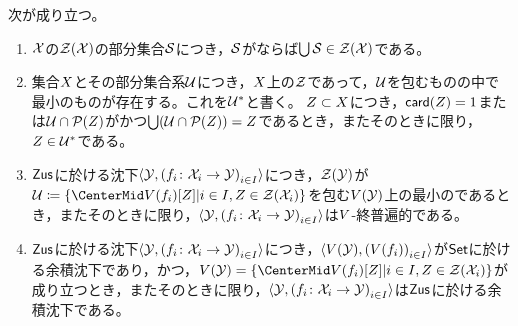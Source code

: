 \begin{theorem}
    次が成り立つ。
    \begin{enumerate}
        \item \WordConnectivitySpace\(\ConnectivitySpace\)の\WordConnectivityStructure\(\ConnectivityStructure(\ConnectivitySpace)\)の部分集合\(\Set<\mathcal{S}>\)につき，\(\Set<\mathcal{S}>\)が\WordChainLinked ならば\(\bigcup\Set<\mathcal{S}>\in\ConnectivityStructure(\ConnectivitySpace)\)である。
        \item 集合\(\Set\)とその部分集合系\(\Set<\mathcal{U}>\)につき，\(\Set\)上の\WordConnectivityStructure\(\ConnectivityStructure\)であって，\(\Set<\mathcal{U}>\)を包むものの中で最小のものが存在する。これを\(\ConnectivityStructureGeneratedBy(\Set<\mathcal{U}>)\)と書く。
        \(\Set<Z>\subset\Set\)につき，\(\Cardinality(\Set<Z>)=1\)または\(\Set<\mathcal{U}>\cap\PowerSet(\Set<Z>)\)が\WordChainLinked かつ\(\bigcup(\Set<\mathcal{U}>\cap\PowerSet(\Set<Z>))=\Set<Z>\)であるとき，またそのときに限り，\(\Set<Z>\in\ConnectivityStructureGeneratedBy(\Set<\mathcal{U}>)\)である。
        \item \(\mathsf{Zus}\)に於ける沈下\(\OrderedSet<\ConnectivitySpace<Y>, \FamilyStyle{\FunctionStyle{\Map_{\Index}}{\ConnectivitySpace_{\Index}}{\ConnectivitySpace<Y>}}{\Index\in\IndexSet}>\)につき，\(\ConnectivityStructure(\ConnectivitySpace<Y>)\)が\(\Set<\mathcal{U}>\coloneqq\Set{\VFunctor(\Map_{\Index})[\Set<Z>] | \Index\in\IndexSet, \Set<Z>\in\ConnectivityStructure(\ConnectivitySpace_{\Index})}\)を包む\(\VFunctor(\ConnectivitySpace<Y>)\)上の最小の\WordConnectivityStructure であるとき，またそのときに限り，\(\OrderedSet<\ConnectivitySpace<Y>, \FamilyStyle{\FunctionStyle{\Map_{\Index}}{\ConnectivitySpace_{\Index}}{\ConnectivitySpace<Y>}}{\Index\in\IndexSet}>\)は\(\VFunctor\)-終普遍的である。
        \item \(\mathsf{Zus}\)に於ける沈下\(\OrderedSet<\ConnectivitySpace<Y>, \FamilyStyle{\FunctionStyle{\Map_{\Index}}{\ConnectivitySpace_{\Index}}{\ConnectivitySpace<Y>}}{\Index\in\IndexSet}>\)につき，\(\OrderedSet<\VFunctor(\ConnectivitySpace<Y>), \FamilyStyle{\VFunctor(\Map_{\Index})}{\Index\in\IndexSet}>\)が\(\mathsf{Set}\)に於ける余積沈下であり，かつ，\(\VFunctor(\ConnectivitySpace<Y>)=\Set{ \VFunctor(\Map_{\Index})[\Set<Z>] | \Index\in\IndexSet, \Set<Z>\in\ConnectivityStructure(\ConnectivitySpace_{\Index}) }\)が成り立つとき，またそのときに限り，\(\OrderedSet<\ConnectivitySpace<Y>, \FamilyStyle{\FunctionStyle{\Map_{\Index}}{\ConnectivitySpace_{\Index}}{\ConnectivitySpace<Y>}}{\Index\in\IndexSet}>\)は\(\mathsf{Zus}\)に於ける余積沈下である。

\end{enumerate}
\end{theorem}
